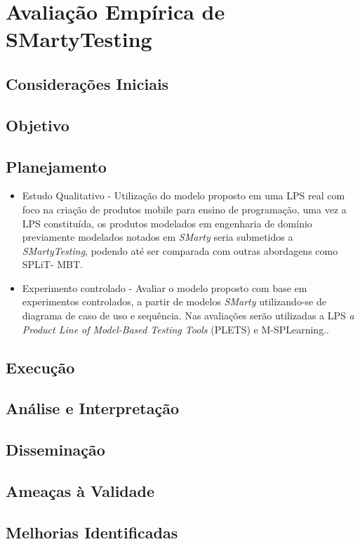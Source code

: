 \chapter{Avaliação Empírica de SMartyTesting}
\label{avaliacao}
\pagestyle{plain}

\section{Considerações Iniciais}
\section{Objetivo}
\section{Planejamento}
\begin{itemize}
	\item Estudo Qualitativo - Utilização do modelo proposto em uma LPS real com foco na criação de produtos mobile para ensino de programação, uma vez a LPS constituída, os produtos modelados em engenharia de domínio previamente modelados notados em \textit{SMarty} seria submetidos a \textit{SMartyTesting}, podendo até ser comparada com outras abordagens como SPLiT- MBT.
	\item Experimento controlado - Avaliar o modelo proposto com base em experimentos controlados, a partir de modelos \textit{SMarty} utilizando-se de diagrama de caso de uso e sequência. Nas avaliações serão utilizadas a LPS \textit{a Product Line of Model-Based Testing Tools} (PLETS) e M-SPLearning..	
\end{itemize}
\section{Execução}
\section{Análise e Interpretação}
\section{Disseminação}
\section{Ameaças à Validade}
\section{Melhorias Identificadas}
